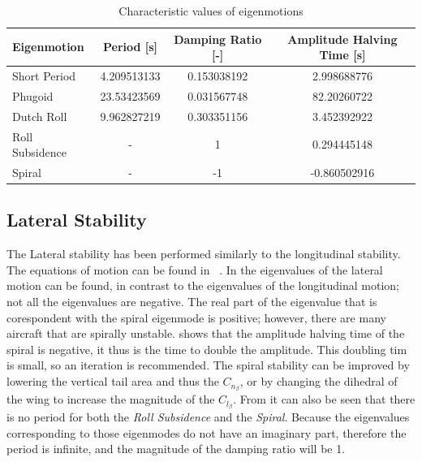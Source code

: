 \begin{table}[h]
\centering
\caption{Characteristic values of eigenmotions}
\label{tab:Characteristic_values_of_eigenmotions}
\begin{tabular}{l|SSS}
\toprule
\textbf{Eigenmotion}     & \textbf{Period [\unit{s}]} & \textbf{Damping Ratio [\unit{-}]} & \textbf{Amplitude Halving Time [\unit{s}]} \\ \midrule
Short Period    & 4.209513133    & 0.153038192           & 2.998688776                    \\
Phugoid         & 23.53423569    & 0.031567748           & 82.20260722                    \\
Dutch Roll      & 9.962827219    & 0.303351156           & 3.452392922                    \\
Roll Subsidence & {-}            & 1                     & 0.294445148                    \\
Spiral          & {-}            & -1                    & -0.860502916  \\
\bottomrule
\end{tabular}
\end{table}


\subsection{Lateral Stability}
\label{subsec:Lateral_Stability}

The Lateral stability has been performed similarly to the longitudinal stability.
The equations of motion can be found in ~\cite{FD_LectureNotes}.
In  the eigenvalues of the lateral motion can be found, in contrast to the eigenvalues of the longitudinal motion; not all the eigenvalues are negative.
The real part of the eigenvalue that is corespondent with the spiral eigenmode is positive; however, there are many aircraft that are spirally unstable.  shows that the amplitude halving time of the spiral is negative, it thus is the time to double the amplitude.
This doubling tim is small, so an iteration is recommended.
The spiral stability can be improved
by lowering the vertical tail area and thus the $C_{n_{\beta}}$, or by changing the dihedral of the wing
to increase the magnitude of the $C_{l_{\beta}}$.
From  it can also be seen that there is no period for both the \textit{Roll Subsidence} and the \textit{Spiral}.
Because the eigenvalues corresponding to those eigenmodes do not have an imaginary part, therefore the period is infinite, and the magnitude of the damping ratio will be 1.

